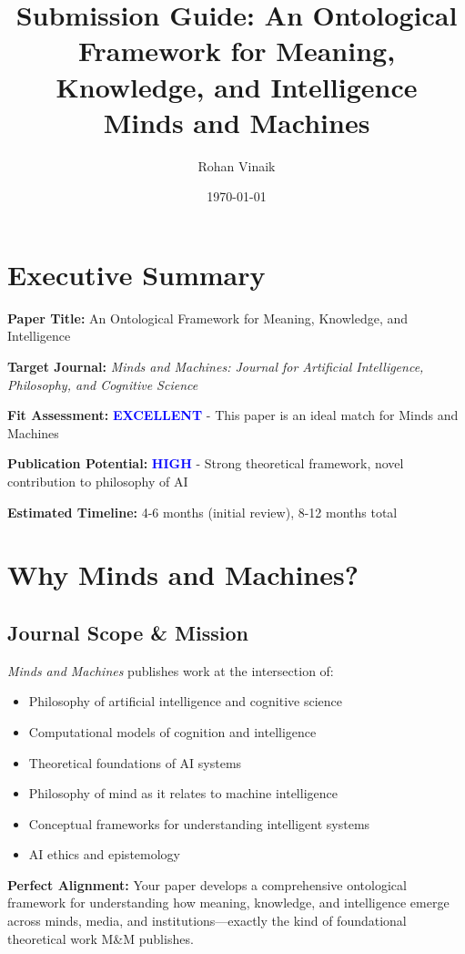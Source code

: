\documentclass[12pt]{article}
\title{\textbf{Submission Guide: An Ontological Framework for Meaning,\\Knowledge, and Intelligence}\\
\large Minds and Machines}
\author{Rohan Vinaik}
\date{\today}
\begin{document}
\maketitle

\section*{Executive Summary}

\textbf{Paper Title:} An Ontological Framework for Meaning, Knowledge, and Intelligence

\textbf{Target Journal:} \textit{Minds and Machines: Journal for Artificial Intelligence, Philosophy, and Cognitive Science}

\textbf{Fit Assessment:} \textcolor{blue}{\textbf{EXCELLENT}} - This paper is an ideal match for Minds and Machines

\textbf{Publication Potential:} \textcolor{blue}{\textbf{HIGH}} - Strong theoretical framework, novel contribution to philosophy of AI

\textbf{Estimated Timeline:} 4-6 months (initial review), 8-12 months total

\section{Why Minds and Machines?}

\subsection{Journal Scope \& Mission}

\textit{Minds and Machines} publishes work at the intersection of:
\begin{itemize}[leftmargin=*]
\item Philosophy of artificial intelligence and cognitive science
\item Computational models of cognition and intelligence
\item Theoretical foundations of AI systems
\item Philosophy of mind as it relates to machine intelligence
\item Conceptual frameworks for understanding intelligent systems
\item AI ethics and epistemology
\end{itemize}

\textbf{Perfect Alignment:} Your paper develops a comprehensive ontological framework for understanding how meaning, knowledge, and intelligence emerge across minds, media, and institutions—exactly the kind of foundational theoretical work M\&M publishes.
\end{document}
